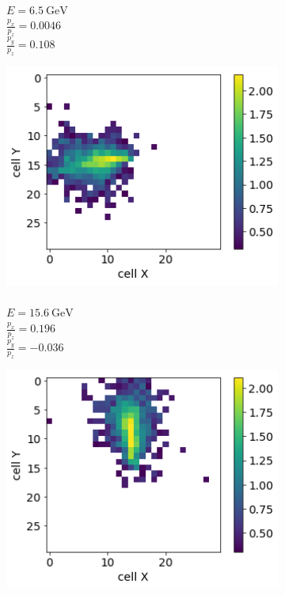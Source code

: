 \documentclass{webofc}
\begin{document}
\begin{figure}
\begin{subfigure}{0.24\textwidth}
    \caption{\\$E = 6.5~\text{GeV}$ \\  $\frac{p_x}{p_z}=0.0046$ \\$\frac{p_y}{p_z}=0.108$}\label{fig:real-imgs-2}
  \end{subfigure}
    \begin{subfigure}{0.24\textwidth}
    \centering
    \includegraphics[width=1\textwidth]{figures/3_real.png}
    \caption{\\$E = 15.6~\text{GeV}$ \\ $\frac{p_x}{p_z}=0.196$ \\ $\frac{p_y}{p_z}=-0.036$}\label{fig:real-imgs-3}
  \end{subfigure}
  \begin{subfigure}{0.24\textwidth}
    \centering
    \includegraphics[width=1\textwidth]{figures/4_real.png}

\end{subfigure}
\end{figure}
\end{document}
